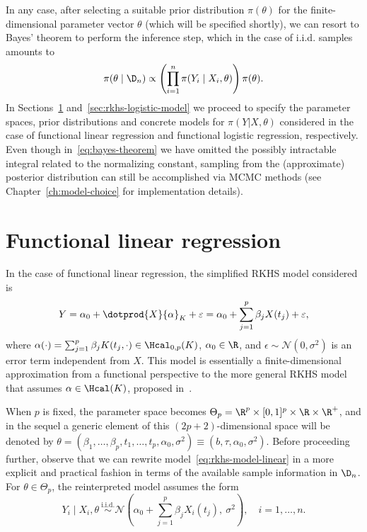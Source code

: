 In any case, after selecting a suitable prior distribution \(\pi(\theta)\) for the finite-dimensional parameter vector \(\theta\) (which will be specified shortly), we can resort to Bayes' theorem to perform the inference step, which in the case of i.i.d. samples amounts to
\begin{equation}\label{eq:bayes-theorem}
  \pi(\theta \mid \D_n) \propto \left( \prod_{i=1}^n \pi(Y_i\mid X_i, \theta) \right)\pi(\theta).
\end{equation}
In Sections~\ref{sec:rkhs-linear-model} and~\ref{sec:rkhs-logistic-model} we proceed to specify the parameter spaces, prior distributions and concrete models for \(\pi(Y | X,\theta)\) considered in the case of functional linear regression and functional logistic regression, respectively. Even though in~\eqref{eq:bayes-theorem} we have omitted the possibly intractable integral related to the normalizing constant, sampling from the (approximate) posterior distribution can still be accomplished via MCMC methods (see Chapter~\ref{ch:model-choice} for implementation details).

\section{Functional linear regression}\label{sec:rkhs-linear-model}

In the case of functional linear regression, the simplified RKHS model considered is
\begin{equation}\label{eq:rkhs-model-linear}
  Y = \alpha_0 + \dotprod{X}{\alpha}_K + \epsilon = \alpha_0 + \sum_{j=1}^p \beta_j X(t_j) + \epsilon,
\end{equation}
where \(\alpha(\cdot) = \sum_{j=1}^p \beta_j K(t_j, \cdot) \in \Hcal_{0,p}(K)\), \(\alpha_0\in\R\), and \(\epsilon \sim \mathcal N(0, \sigma^2)\) is an error term independent from \(X\). This model is essentially a finite-dimensional approximation from a functional perspective to the more general RKHS model that assumes \(\alpha \in \Hcal(K)\), proposed in~\citet{berrendero2019rkhs}.

When \(p\) is fixed, the parameter space becomes \(\Theta_p = \R^p \times [0, 1]^p \times \R \times \R^+\), and in the sequel a generic element of this \((2p+2)\)-dimensional space will be denoted by \(\theta = (\beta_1,\dots, \beta_p, t_1,\dots, t_p, \alpha_0, \sigma^2) \equiv (b, \tau, \alpha_0, \sigma^2)\). Before proceeding further, observe that we can rewrite model~\eqref{eq:rkhs-model-linear} in a more explicit and practical fashion in terms of the available sample information in \(\D_n\). For \(\theta \in \Theta_p\), the reinterpreted model assumes the form
\begin{equation}\label{eq:rkhs-model-linear-2}
  Y_i \mid X_i, \theta \ \stackrel{\text{i.i.d.}}{\sim} \mathcal N\left(\alpha_0 + \sum_{j=1}^p \beta_j X_i(t_j), \ \sigma^2\right), \quad i =1,\dots, n.
\end{equation}

